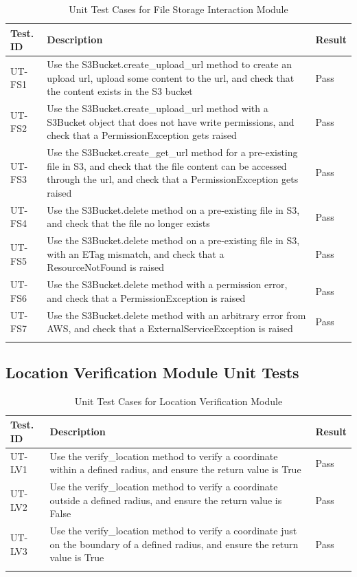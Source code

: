 \documentclass[12pt, titlepage]{article}
\begin{document}
\begin{longtable}{|m{2cm}|m{10cm}|m{1.4cm}|}
  \hline
  \textbf{Test. ID} & \textbf{Description} & \textbf{Result} \\ \hline
  UT-FS1 & Use the S3Bucket.create\_upload\_url method to create an
  upload url, upload some content to the url, and check that the
  content exists in the S3 bucket & Pass\\ \hline
  UT-FS2 & Use the S3Bucket.create\_upload\_url method with a
  S3Bucket object that does not have write permissions, and check
  that a PermissionException gets raised & Pass\\ \hline
  UT-FS3 & Use the S3Bucket.create\_get\_url method for a
  pre-existing file in S3, and check that the file content can be
  accessed through the url, and check that a PermissionException gets
  raised & Pass\\ \hline
  UT-FS4 & Use the S3Bucket.delete method on a pre-existing file in
  S3, and check that the file no longer exists & Pass\\ \hline
  UT-FS5 & Use the S3Bucket.delete method on a pre-existing file in
  S3, with an ETag mismatch, and check that a ResourceNotFound is
  raised & Pass\\ \hline
  UT-FS6 & Use the S3Bucket.delete method with a permission error,
  and check that a PermissionException is raised & Pass\\ \hline
  UT-FS7 & Use the S3Bucket.delete method with an arbitrary error
  from AWS, and check that a ExternalServiceException is raised & Pass\\ \hline
  \caption{Unit Test Cases for File Storage Interaction Module}
\end{longtable}

\subsection{Location Verification Module Unit Tests}

\begin{longtable}{|m{2cm}|m{10cm}|m{1.4cm}|}
  \hline
  \textbf{Test. ID} & \textbf{Description} & \textbf{Result} \\ \hline
  UT-LV1 & Use the verify\_location method to verify a coordinate
  within a defined radius, and ensure the return value is True & Pass\\ \hline
  UT-LV2 & Use the verify\_location method to verify a coordinate
  outside a defined radius, and ensure the return value is False & Pass\\ \hline
  UT-LV3 & Use the verify\_location method to verify a coordinate
  just on the boundary of a defined radius, and ensure the return
  value is True & Pass\\ \hline
  \caption{Unit Test Cases for Location Verification Module}
\end{longtable}
\end{document}
